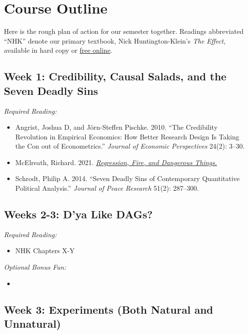 \documentclass[11pt, letterpaper]{article}
\begin{document}
\section*{Course Outline}

Here is the rough plan of action for our semester together. Readings abbreviated ``NHK'' denote our primary textbook, Nick Huntington-Klein's \textit{The Effect}, available in hard copy or \href{https://theeffectbook.net/}{free online}.

\subsection*{Week 1: Credibility, Causal Salads, and the Seven Deadly Sins}

\textit{Required Reading:}

\begin{itemize}
	\item Angrist, Joshua D, and Jörn-Steffen Pischke. 2010. ``The Credibility Revolution in Empirical Economics: How Better Research Design Is Taking the Con out of Econometrics.'' \textit{Journal of Economic Perspectives} 24(2): 3–30.
	\item McElreath, Richard. 2021. \href{https://elevanth.org/blog/2021/06/15/regression-fire-and-dangerous-things-1-3/}{\textit{Regression, Fire, and Dangerous Things.}}
	\item Schrodt, Philip A. 2014. ``Seven Deadly Sins of Contemporary Quantitative Political Analysis.'' \textit{Journal of Peace Research} 51(2): 287–300.
\end{itemize}




\subsection*{Weeks 2-3: D'ya Like DAGs?}

\textit{Required Reading:}

\begin{itemize}
	\item NHK Chapters X-Y 
\end{itemize}

\noindent \textit{Optional Bonus Fun:}

\begin{itemize}
	\item 
\end{itemize}

\subsection*{Week 3: Experiments (Both Natural and Unnatural)}
\end{document}
